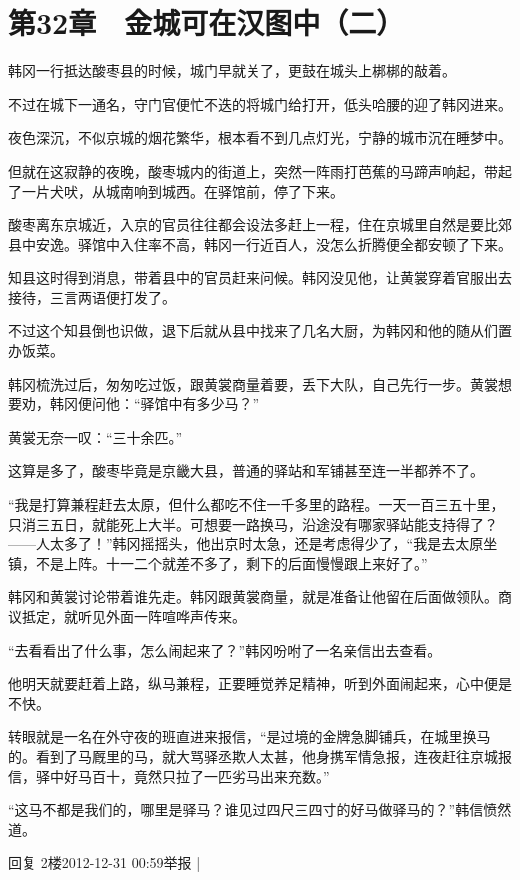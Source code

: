 \section{第32章　金城可在汉图中（二）}

韩冈一行抵达酸枣县的时候，城门早就关了，更鼓在城头上梆梆的敲着。

不过在城下一通名，守门官便忙不迭的将城门给打开，低头哈腰的迎了韩冈进来。

夜色深沉，不似京城的烟花繁华，根本看不到几点灯光，宁静的城市沉在睡梦中。

但就在这寂静的夜晚，酸枣城内的街道上，突然一阵雨打芭蕉的马蹄声响起，带起了一片犬吠，从城南响到城西。在驿馆前，停了下来。

酸枣离东京城近，入京的官员往往都会设法多赶上一程，住在京城里自然是要比郊县中安逸。驿馆中入住率不高，韩冈一行近百人，没怎么折腾便全都安顿了下来。

知县这时得到消息，带着县中的官员赶来问候。韩冈没见他，让黄裳穿着官服出去接待，三言两语便打发了。

不过这个知县倒也识做，退下后就从县中找来了几名大厨，为韩冈和他的随从们置办饭菜。

韩冈梳洗过后，匆匆吃过饭，跟黄裳商量着要，丢下大队，自己先行一步。黄裳想要劝，韩冈便问他：“驿馆中有多少马？”

黄裳无奈一叹：“三十余匹。”

这算是多了，酸枣毕竟是京畿大县，普通的驿站和军铺甚至连一半都养不了。

“我是打算兼程赶去太原，但什么都吃不住一千多里的路程。一天一百三五十里，只消三五日，就能死上大半。可想要一路换马，沿途没有哪家驿站能支持得了？——人太多了！”韩冈摇摇头，他出京时太急，还是考虑得少了，“我是去太原坐镇，不是上阵。十一二个就差不多了，剩下的后面慢慢跟上来好了。”

韩冈和黄裳讨论带着谁先走。韩冈跟黄裳商量，就是准备让他留在后面做领队。商议抵定，就听见外面一阵喧哗声传来。

“去看看出了什么事，怎么闹起来了？”韩冈吩咐了一名亲信出去查看。

他明天就要赶着上路，纵马兼程，正要睡觉养足精神，听到外面闹起来，心中便是不快。

转眼就是一名在外守夜的班直进来报信，“是过境的金牌急脚铺兵，在城里换马的。看到了马厩里的马，就大骂驿丞欺人太甚，他身携军情急报，连夜赶往京城报信，驿中好马百十，竟然只拉了一匹劣马出来充数。”

“这马不都是我们的，哪里是驿马？谁见过四尺三四寸的好马做驿马的？”韩信愤然道。

回复 2楼2012-12-31 00:59举报 |

